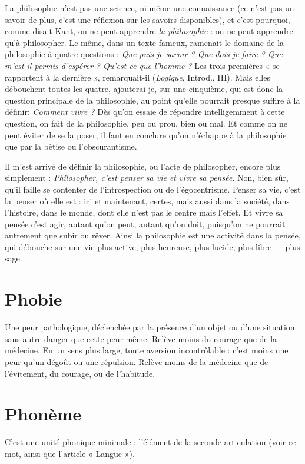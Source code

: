 La philosophie n’est pas une science, ni même une connaissance (ce n’est
pas un savoir de plus, c’est une réflexion sur les savoirs disponibles), et c’est
pourquoi, comme disait Kant, on ne peut apprendre {\it la philosophie} : on ne
peut apprendre qu’à philosopher. Le même, dans un texte fameux, ramenait
le domaine de la philosophie à quatre questions : {\it Que puis-je savoir ? Que
dois-je faire ? Que m'est-il permis d'espérer ? Qu'est-ce que l'homme ?} Les trois
premières « se rapportent à la dernière », remarquait-il ({\it Logique}, Introd.,
III). Mais elles débouchent toutes les quatre, ajouterai-je, sur une cinquième,
qui est donc la question principale de la philosophie, au point
qu’elle pourrait presque suffire à la définir: {\it Comment vivre ?} Dès qu'on
essaie de répondre intelligemment à cette question, on fait de la philosophie,
peu ou prou, bien ou mal. Et comme on ne peut éviter de se la poser, il faut
en conclure qu’on n'échappe à la philosophie que par la bêtise ou l’obscurantisme.

Il m'est arrivé de définir la philosophie, ou l’acte de philosopher, encore
plus simplement : {\it Philosopher, c'est penser sa vie et vivre sa pensée}. Non, bien sûr,
qu’il faille se contenter de l’introspection ou de l’égocentrisme. Penser sa vie,
c’est la penser où elle est : ici et maintenant, certes, mais aussi dans la société,
dans l’histoire, dans le monde, dont elle n’est pas le centre mais l'effet. Et vivre
sa pensée c’est agir, autant qu’on peut, autant qu’on doit, puisqu'on ne pourrait
autrement que subir ou rêver. Ainsi la philosophie est une activité dans la
pensée, qui débouche sur une vie plus active, plus heureuse, plus lucide, plus
libre — plus sage.

\section{Phobie}
Une peur pathologique, déclenchée par la présence d’un objet ou
d’une situation sans autre danger que cette peur même. Relève
moins du courage que de la médecine.
En un sens plus large, toute aversion incontrôlable : c’est moins une peur
qu’un dégoût ou une répulsion. Relève moins de la médecine que de l’évitement,
du courage, ou de l’habitude.

\section{Phonème}
C’est une unité phonique minimale : l'élément de la seconde
articulation (voir ce mot, ainsi que l’article « Langue »).

